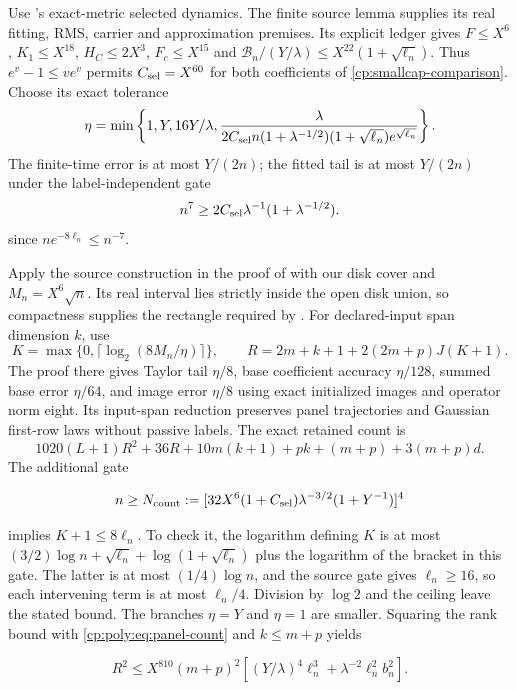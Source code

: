Use 's exact-metric selected dynamics.
The finite source lemma supplies its real fitting, RMS, carrier and
approximation premises. Its explicit ledger gives
$F\le X^6$, $K_1\le X^{18}$, $H_C\le2X^3$, $F_c\le X^{15}$ and
$\mathcal B_n/(Y/\lambda)\le X^{22}(1+\sqrt{\ell_n})$.
Thus $e^v-1\le ve^v$ permits $C_{\rm sel}=X^{60}$ for both
coefficients of \eqref{cp:smallcap-comparison}.
Choose its exact tolerance
\[
\eta=\min\left\{1,Y,16Y/\lambda,
\frac{\lambda}
 {2C_{\rm sel}n(1+\lambda^{-1/2})(1+\sqrt{\ell_n})e^{\sqrt{\ell_n}}}
\right\}.
\]
The finite-time error is at most $Y/(2n)$; the fitted tail is at most
$Y/(2n)$ under the label-independent gate
\begin{equation}
n^7\ge2C_{\rm sel}\lambda^{-1}(1+\lambda^{-1/2}).
\label{cp:poly:eq:taylor-tail-gate}
\end{equation}
since $ne^{-8\ell_n}\le n^{-7}$.

Apply the source construction in the proof of  with
our disk cover and $M_n=X^6\sqrt n$. Its real interval lies strictly
inside the open disk union, so compactness supplies the rectangle
required by . For declared-input span dimension $k$, use
\[
K=\max\{0,\lceil\log_2(8M_n/\eta)\rceil\},\qquad
R=2m+k+1+2(2m+p)J(K+1).
\]
The proof there gives Taylor tail $\eta/8$, base coefficient accuracy
$\eta/128$, summed base error $\eta/64$, and image error $\eta/8$
using exact initialized images and operator norm eight.
Its input-span reduction preserves panel trajectories and Gaussian
first-row laws without passive labels. The exact retained count is
\[
1020(L+1)R^2+36R+10m(k+1)+pk+(m+p)+3(m+p)d.
\]
The additional gate

\begin{equation}
n\ge N_{\rm count}:=
 [32X^6(1+C_{\rm sel})\lambda^{-3/2}(1+Y^{-1})]^4
\label{cp:poly:eq:taylor-count-gate}
\end{equation}

implies $K+1\le8\ell_n$. To check it, the logarithm defining $K$ is
at most $(3/2)\log n+\sqrt{\ell_n}+\log(1+\sqrt{\ell_n})$ plus
the logarithm of the bracket in this gate. The latter is at most
$(1/4)\log n$, and the source gate gives $\ell_n\ge16$, so each
intervening term is at most $\ell_n/4$. Division by $\log2$ and the
ceiling leave the stated bound. The branches $\eta=Y$ and $\eta=1$
are smaller. Squaring the rank bound with
\eqref{cp:poly:eq:panel-count} and $k\le m+p$ yields

\[
R^2\le X^{810}(m+p)^2
 \left[(Y/\lambda)^4\ell_n^3+\lambda^{-2}\ell_n^2b_n^2\right].
\]


